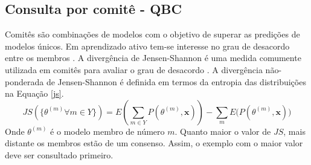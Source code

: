 % 


\subsection{Consulta por comitê - QBC}\label{qbc}
Comitês são combinações de modelos com o objetivo de superar as predições de
modelos únicos.
Em aprendizado ativo tem-se interesse no grau de desacordo entre os membros
\citep{conf/icml/AbeM98}.
A divergência de Jensen-Shannon \cite{journals/tit/Lin91} é uma medida
comumente utilizada em comitês para
avaliar o grau de desacordo \cite{Melville:2004:DEA:1015330.1015385}.
A divergência não-ponderada de Jensen-Shannon é definida em termos da
entropia das distribuições
na Equação \ref{js}.
\begin{equation}\label{js}
 JS(\{\theta^{(m)} \forall m \in Y\}) = E(\sum_{m \in Y}{P(\theta^{(m)},\bm{x})}) - \sum_m{E(P(\theta^{(m)},\bm{x})})
\end{equation}
Onde $\theta^{(m)}$ é o modelo membro de número $m$.
Quanto maior o valor de $JS$, mais distante os membros estão de um consenso.
Assim, o exemplo com o maior valor deve ser consultado primeiro.

